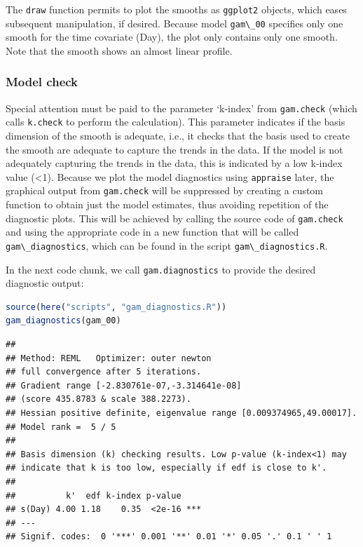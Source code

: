 \documentclass[
]{article}
\newcommand{\passthrough}[1]{#1}
\begin{document}
The \passthrough{\lstinline!draw!} function permits to plot the smooths as \passthrough{\lstinline!ggplot2!} objects, which eases subsequent manipulation, if desired. Because model \passthrough{\lstinline!gam\_00!} specifies only one smooth for the time covariate (Day), the plot only contains only one smooth. Note that the smooth shows an almost linear profile.

\hypertarget{gam-00-model-check}{%
\subsubsection{Model check}\label{gam-00-model-check}}

Special attention must be paid to the parameter `k-index' from \passthrough{\lstinline!gam.check!} (which calls \passthrough{\lstinline!k.check!} to perform the calculation). This parameter indicates if the basis dimension of the smooth is adequate, i.e., it checks that the basis used to create the smooth are adequate to capture the trends in the data. If the model is not adequately capturing the trends in the data, this is indicated by a low k-index value (\textless1). Because we plot the model diagnostics using \passthrough{\lstinline!appraise!} later, the graphical output from \passthrough{\lstinline!gam.check!} will be suppressed by creating a custom function to obtain just the model estimates, thus avoiding repetition of the diagnostic plots. This will be achieved by calling the source code of \passthrough{\lstinline!gam.check!} and using the appropriate code in a new function that will be called \passthrough{\lstinline!gam\_diagnostics!}, which can be found in the script \passthrough{\lstinline!gam\_diagnostics.R!}.

In the next code chunk, we call \passthrough{\lstinline!gam.diagnostics!} to provide the desired diagnostic output:

\begin{lstlisting}[language=R]
source(here("scripts", "gam_diagnostics.R"))
gam_diagnostics(gam_00)
\end{lstlisting}

\begin{lstlisting}
## 
## Method: REML   Optimizer: outer newton
## full convergence after 5 iterations.
## Gradient range [-2.830761e-07,-3.314641e-08]
## (score 435.8783 & scale 388.2273).
## Hessian positive definite, eigenvalue range [0.009374965,49.00017].
## Model rank =  5 / 5 
## 
## Basis dimension (k) checking results. Low p-value (k-index<1) may
## indicate that k is too low, especially if edf is close to k'.
## 
##          k'  edf k-index p-value    
## s(Day) 4.00 1.18    0.35  <2e-16 ***
## ---
## Signif. codes:  0 '***' 0.001 '**' 0.01 '*' 0.05 '.' 0.1 ' ' 1
\end{lstlisting}
\end{document}
